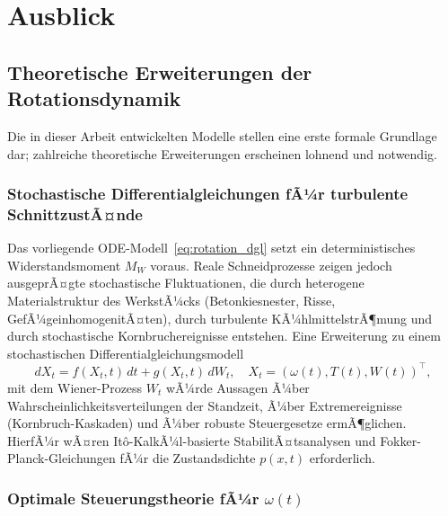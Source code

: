 ﻿\documentclass[a4paper,12pt]{article}
\theoremstyle{definition}
\begin{document}
\section{Ausblick}

\subsection{Theoretische Erweiterungen der Rotationsdynamik}

Die in dieser Arbeit entwickelten Modelle stellen eine erste formale Grundlage dar;
zahlreiche theoretische Erweiterungen erscheinen lohnend und notwendig.

\subsubsection{Stochastische Differentialgleichungen fÃ¼r turbulente SchnittzustÃ¤nde}

Das vorliegende ODE-Modell~\eqref{eq:rotation_dgl} setzt ein deterministisches
Widerstandsmoment $M_W$ voraus. Reale Schneidprozesse zeigen jedoch ausgeprÃ¤gte
stochastische Fluktuationen, die durch heterogene Materialstruktur des WerkstÃ¼cks
(Betonkiesnester, Risse, GefÃ¼geinhomoge\-nitÃ¤ten), durch turbulente KÃ¼hlmittelstrÃ¶mung
und durch stochastische Kornbruchereignisse entstehen. Eine Erweiterung zu einem
stochastischen Differentialgleichungsmodell
\[
dX_t = f(X_t, t)\,dt + g(X_t, t)\,dW_t, \quad X_t = (\omega(t), T(t), W(t))^\top,
\]
mit dem Wiener-Prozess $W_t$ wÃ¼rde Aussagen Ã¼ber Wahrscheinlichkeitsverteilungen
der Standzeit, Ã¼ber Extremereignisse (Kornbruch-Kaskaden) und Ã¼ber robuste Steuergesetze
ermÃ¶glichen. HierfÃ¼r wÃ¤ren It\^{o}-KalkÃ¼l-basierte StabilitÃ¤tsanalysen und
Fokker-Planck-Gleichungen fÃ¼r die Zustandsdichte $p(x,t)$ erforderlich.

\subsubsection{Optimale Steuerungstheorie fÃ¼r $\omega(t)$}
\end{document}

